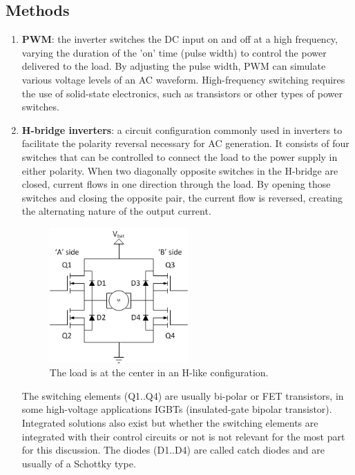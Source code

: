 \subsection{Methods}
\begin{enumerate}
    \item \textbf{PWM}: the inverter switches the DC input on and off at a high frequency, varying the duration of the 'on' time (pulse width) to control the power delivered to the load. By adjusting the pulse width, PWM can simulate various voltage levels of an AC waveform. High-frequency switching requires the use of solid-state electronics, such as transistors or other types of power switches.
    \item \textbf{H-bridge inverters}:  a circuit configuration commonly used in inverters to facilitate the polarity reversal necessary for AC generation. It consists of four switches that can be controlled to connect the load to the power supply in either polarity. When two diagonally opposite switches in the H-bridge are closed, current flows in one direction through the load. By opening those switches and closing the opposite pair, the current flow is reversed, creating the alternating nature of the output current.
    \begin{figure}[H]
        \centering
        \includegraphics[width=0.5\textwidth]{figs/ch03/h-bridge.png}
        \caption{The load is at the center in an H-like configuration.}
    \end{figure}
    The switching elements (Q1..Q4) are usually bi-polar or FET transistors, in some high-voltage applications IGBTs (insulated-gate bipolar transistor). Integrated solutions also exist but whether the switching elements are integrated with their control circuits or not is not relevant for the most part for this discussion. The diodes (D1..D4) are called catch diodes and are usually of a Schottky type.


\end{enumerate}
